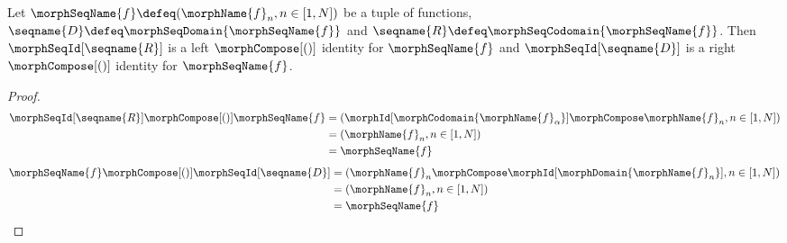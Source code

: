 \documentclass{article}
\begin{document}
\begin{lemma}
\label{lem:tupfunc}
Let $\morphSeqName{f} \defeq (\morphName{f}_n, n \in [1,N])$ be a tuple of
functions,
$\seqname{D} \defeq \morphSeqDomain{\morphSeqName{f}}$ and
$\seqname{R} \defeq \morphSeqCodomain{\morphSeqName{f}}$. Then $\morphSeqId[\seqname{R}]$ is a
left $\morphCompose[()]$ identity for $\morphSeqName{f}$ and $\morphSeqId[\seqname{D}]$
is a right $\morphCompose[()]$ identity for $\morphSeqName{f}$.

\begin{proof}
\begin{equation*}
\begin{split}
  \morphSeqId[\seqname{R}] \morphCompose[()] \morphSeqName{f}
  & =
  (\morphId[\morphCodomain{\morphName{f}_\alpha}] \morphCompose \morphName{f}_n, n \in [1,N])
\\*
  & =
  (\morphName{f}_n, n \in [1,N])
\\*
  & =
  \morphSeqName{f}
\end{split}
\end{equation*}
\begin{equation*}
\begin{split}
  \morphSeqName{f} \morphCompose[()] \morphSeqId[\seqname{D}]
  & =
  (\morphName{f}_n \morphCompose \morphId[\morphDomain{\morphName{f}_n}], n \in [1,N])
\\*
  & =
  (\morphName{f}_n, n \in [1,N])
\\*
  & =
  \morphSeqName{f}
\end{split}
\end{equation*}
\end{proof}
\end{lemma}
\end{document}
